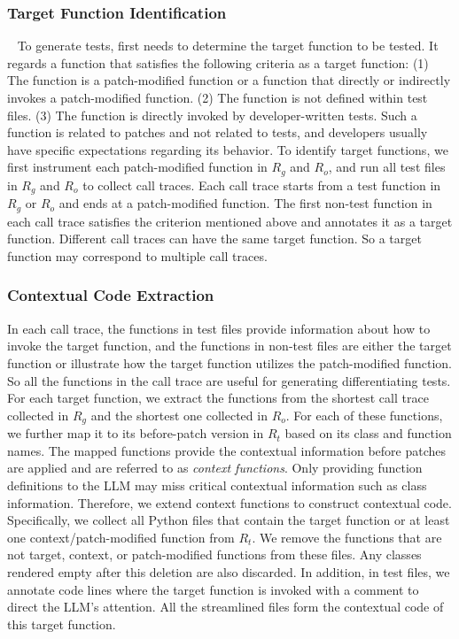 \subsubsection{Target Function Identification}~\label{subsubsec:target-func}
To generate tests, \appname first needs to determine the target function to be tested.
It regards a function that satisfies the following criteria as a target function: (1) The function is a patch-modified function or a function that directly or indirectly invokes a patch-modified function. (2) The function is not defined within test files. (3) The function is directly invoked by developer-written tests.
Such a function is related to patches and not related to tests, and developers usually have specific expectations regarding its behavior.
To identify target functions, we first instrument each patch-modified function in $R_g$ and $R_o$, and run all test files in $R_g$ and $R_o$ to collect call traces.
Each call trace starts from a test function in $R_g$ or $R_o$ and ends at a patch-modified function.
The first non-test function in each call trace satisfies the criterion mentioned above and \appname annotates it as a target function.
Different call traces can have the same target function.
So a target function may correspond to multiple call traces.


\subsubsection{Contextual Code Extraction}
In each call trace, the functions in test files provide information about how to invoke the target function, and the functions in non-test files are either the target function or illustrate how the target function utilizes the patch-modified function.
So all the functions in the call trace are useful for generating differentiating tests.
For each target function, we extract the functions from the shortest call trace collected in $R_g$ and the shortest one collected in $R_o$.
For each of these functions, we further map it to its before-patch version in $R_t$ based on its class and function names.
The mapped functions provide the contextual information before patches are applied and are referred to as \emph{context functions}.
Only providing function definitions to the LLM may miss critical contextual information such as class information.
Therefore, we extend context functions to construct contextual code.
Specifically, we collect all Python files that contain the target function or at least one context/patch-modified function from $R_t$. We remove the functions that are not target, context, or patch-modified functions from these files.
Any classes rendered empty after this deletion are also discarded.
In addition, in test files, we annotate code lines where the target function is invoked with a comment to direct
the LLM’s attention.
All the streamlined files form the contextual code of this target function.

